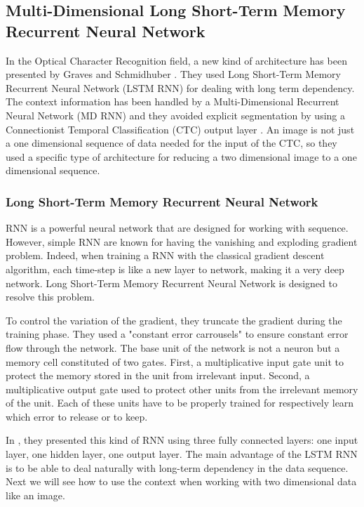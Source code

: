 \documentclass[11pt]{sdm}
\begin{document}
\subsection{Multi-Dimensional Long Short-Term Memory Recurrent Neural Network}

In the Optical Character Recognition field, a new kind of architecture has been presented by Graves and Schmidhuber \cite{graves_offline_2009}.
They used Long Short-Term Memory Recurrent Neural Network (LSTM RNN) \cite{hochreiter_long_1997} for dealing with long term dependency.
The context information has been handled by a Multi-Dimensional Recurrent Neural Network (MD RNN) and they avoided explicit segmentation by using a Connectionist Temporal Classification (CTC) output layer \cite{graves_connectionist_2006}.
An image is not just a one dimensional sequence of data needed for the input of the CTC, so they used a specific type of architecture for reducing a two dimensional image to a one dimensional sequence.

\subsubsection{Long Short-Term Memory Recurrent Neural Network}

RNN is a powerful neural network that are designed for working with sequence.
However, simple RNN are known for having the vanishing and exploding gradient problem.
Indeed, when training a RNN with the classical gradient descent algorithm, each time-step is like a new layer to network, making it a very deep network.
Long Short-Term Memory Recurrent Neural Network is designed to resolve this problem.

To control the variation of the gradient, they truncate the gradient during the training phase.
They used a "constant error carrousels" to ensure constant error flow through the network.
The base unit of the network is not a neuron but a memory cell constituted of two gates.
First, a multiplicative input gate unit to protect the memory stored in the unit from irrelevant input.
Second, a multiplicative output gate used to protect other units from the irrelevant memory of the unit.
Each of these units have to be properly trained for respectively learn which error to release or to keep.

In \cite{hochreiter_long_1997}, they presented this kind of RNN using three fully connected layers: one input layer, one hidden layer, one output layer.
The main advantage of the LSTM RNN is to be able to deal naturally with long-term dependency in the data sequence.
Next we will see how to use the context when working with two dimensional data like an image.
\end{document}
